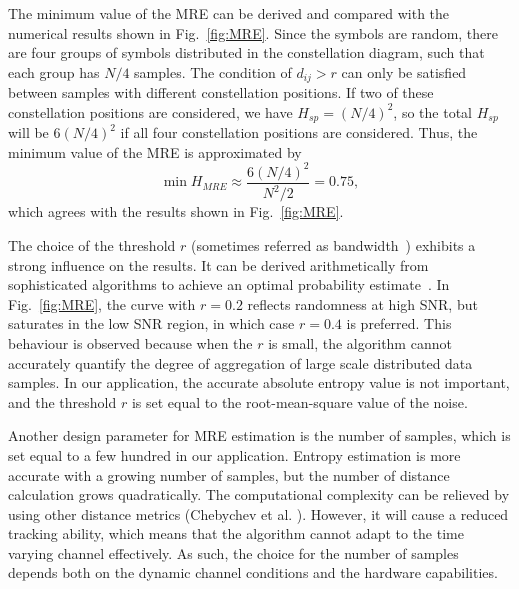 \documentclass[12pt, draftclsnofoot, onecolumn]{IEEEtran}
\begin{document}
The minimum value of the MRE can be derived and compared with the numerical results shown in Fig.~\ref{fig:MRE}.
Since the symbols are random, there are four groups of symbols distributed in the constellation diagram, such that each group has \(N/4\) samples.
The condition of $d_{ij}>r$ can only be satisfied between samples with different constellation positions.
If two of these constellation positions are considered, we have $H_{sp} = (N/4)^2$, so the total $H_{sp}$ will be $6 (N/4)^2$ if all four constellation positions are considered.
Thus, the minimum value of the MRE is approximated by
\begin{equation}
\min{H_{MRE}} \approx \frac{ 6 \left(N/4\right)^2}{N^2/2}=0.75,
\label{eq:adEntQPSK}
\end{equation}
which agrees with the results shown in Fig.~\ref{fig:MRE}.




The choice of the threshold \(r\) (sometimes referred as bandwidth~\cite{Botev2010}) exhibits a strong influence on the results.
It can be derived arithmetically from sophisticated algorithms to achieve an optimal probability estimate~\cite{Botev2010}.
In Fig.~\ref{fig:MRE}, the curve with \(r=0.2\) reflects randomness at high SNR, but saturates in the low SNR region, in which case \(r=0.4\) is preferred.
This behaviour is observed because when the \(r\) is small, the algorithm cannot accurately quantify the degree of aggregation of large scale distributed data samples.
In our application, the accurate absolute entropy value is not important, and the threshold $r$ is set equal to the root-mean-square value of the noise.

Another design parameter for MRE estimation is the number of samples, which is set equal to a few hundred in our application.
Entropy estimation is more accurate with a growing number of samples, but the number of distance calculation grows quadratically.
The computational complexity can be relieved by 
using other distance metrics (Chebychev et al. \cite{Cha2007}).
However, it will cause a reduced tracking ability, which means that the algorithm cannot adapt to the time varying channel effectively.
As such, the choice for the number of samples depends both on the dynamic channel conditions and the hardware capabilities.
% 
% 
\end{document}
